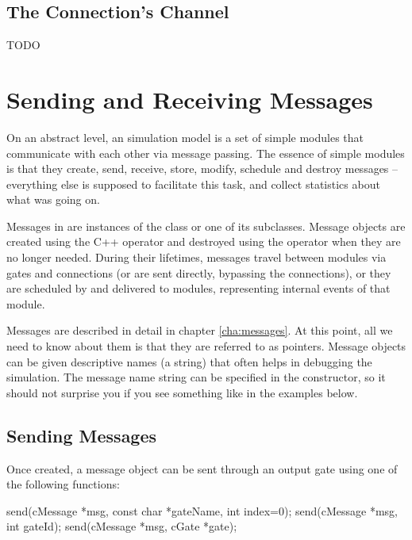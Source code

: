 \subsection{The Connection's Channel}

TODO


\section{Sending and Receiving Messages}
\label{sec:simple-modules:sending-and-receiving}

On an abstract level, an {\opp} simulation model is a set of
simple modules that communicate with each other via message passing.
The essence of simple modules is that they create, send, receive,
store, modify, schedule and destroy messages -- everything else
is supposed to facilitate this task, and collect statistics
about what was going on.

Messages in {\opp} are instances of the  class or
one of its subclasses. Message objects are created using the C++
 operator and destroyed using the  operator
when they are no longer needed. During their lifetimes,
messages travel between modules via gates and connections
(or are sent directly, bypassing the connections), or
they are scheduled by and delivered to modules,
representing internal events of that module.

Messages are described in detail in chapter \ref{cha:messages}.
At this point, all we need to know about them is that they are
referred to as  pointers. Message objects
can be given descriptive names (a  string)
that often helps in debugging the simulation. The message
name string can be specified in the constructor, so it
should not surprise you if you see something like
 in the examples below.



\subsection{Sending Messages}

Once created, a message object can be sent through an
output gate using one of the following functions:

\begin{cpp}
send(cMessage *msg, const char *gateName, int index=0);
send(cMessage *msg, int gateId);
send(cMessage *msg, cGate *gate);
\end{cpp}

